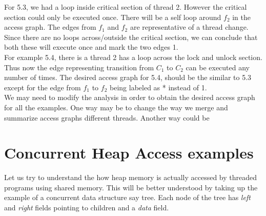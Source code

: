 For 5.3, we had a loop inside critical section of thread 2. However the critical section could only be executed once. There will be a self loop around $f_2$ in the access graph. The edges from $f_1$ and $f_2$ are representative of a thread change. Since there are no loops across/outside the critical section, we can conclude that both these will execute once and mark the two edges 1. \\

For example 5.4, there is a thread 2 has a loop across the lock and unlock section. Thus now the edge representing transition from $C_1$ to $C_2$ can be executed any number of times. The desired access graph for 5.4, should be the similar to 5.3 except for the edge from $f_1$ to $f_2$ being labeled as * instead of 1. \\

We may need to modify the analysis in order to obtain the desired access graph for all the examples. One way may be to change the way we merge and summarize access graphs different threads. Another way could be   

\section{Concurrent Heap Access examples}

Let us try to understand the how heap memory is actually accessed by threaded programs using shared memory. This will be better understood by taking up the example of a concurrent data structure say tree. Each node of the tree has \emph{left} and \emph{right} fields pointing to children and a \emph{data} field.   